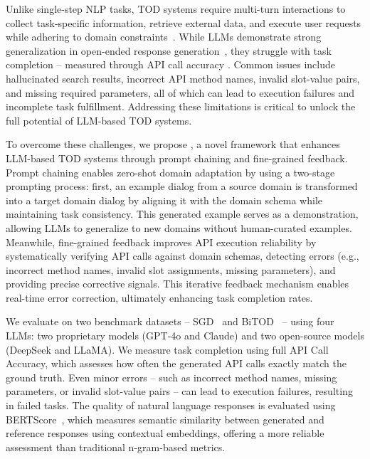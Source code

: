 Unlike single-step NLP tasks, TOD systems require multi-turn interactions to collect task-specific information, retrieve external data, and execute user requests while adhering to domain constraints~\cite{chung-etal-2023-instructtods}. While LLMs demonstrate strong generalization in open-ended response generation~\cite{naveed2023comprehensive}, they struggle with task completion -- measured through API call accuracy \cite{10.5555/3666122.3666499, jain2024mitigating, song2025callnavi}. 
Common issues include hallucinated search results, incorrect API method names, invalid slot-value pairs, and missing required parameters, all of which can lead to execution failures and incomplete task fulfillment. Addressing these limitations is critical to unlock the full potential of LLM-based TOD systems.

To overcome these challenges, we propose {\ours}, a novel framework that enhances LLM-based TOD systems through prompt chaining and fine-grained feedback. Prompt chaining enables zero-shot domain adaptation by using a two-stage prompting process: first, an example dialog from a source domain is transformed into a target domain dialog by aligning it with the domain schema while maintaining task consistency. This generated example serves as a demonstration, allowing LLMs to generalize to new domains without human-curated examples. Meanwhile, fine-grained feedback improves API execution reliability by systematically verifying API calls against domain schemas, detecting errors (e.g., incorrect method names, invalid slot assignments, missing parameters), and providing precise corrective signals. This iterative feedback mechanism enables real-time error correction, ultimately enhancing task completion rates.




We evaluate {\ours} on two benchmark datasets -- SGD~\cite{rastogi2020towards} and BiTOD~\cite{lin2021bitod} -- using four LLMs: two proprietary models (GPT-4o and Claude) and two open-source models (DeepSeek and LLaMA). We measure task completion using full API Call Accuracy, which assesses how often the generated API calls exactly match the ground truth. Even minor errors -- such as incorrect method names, missing parameters, or invalid slot-value pairs -- can lead to execution failures, resulting in failed tasks. The quality of natural language responses is evaluated using BERTScore~\cite{zhang2019bertscore}, which measures semantic similarity between generated and reference responses using contextual embeddings, offering a more reliable assessment than traditional n-gram-based metrics.



